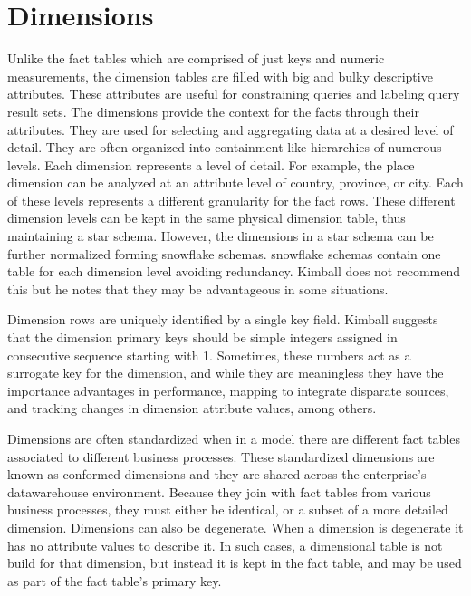 \documentclass[]{article}
\begin{document}

\section{Dimensions} %
\label{sec:dimensions}

Unlike the fact tables which are comprised of just keys and numeric measurements, the dimension tables are filled with big and bulky
descriptive attributes. These attributes are useful for constraining queries and labeling query result sets. The dimensions provide the
context for the facts through their attributes. They are used for selecting and aggregating data at a desired level of detail. They are
often organized into containment-like hierarchies of numerous levels. Each dimension represents a level of detail. For example, the
place dimension can be analyzed at an attribute level of country, province, or city. Each of these levels represents a different
granularity for the fact rows. These different dimension levels can be kept in the same physical dimension table, thus maintaining a
star schema. However, the dimensions in a star schema can be further normalized forming snowflake schemas. snowflake schemas contain one
table for each dimension level avoiding redundancy. Kimball does not recommend this but he notes that they may be advantageous in some
situations.

Dimension rows are uniquely identified by a single key field. Kimball suggests that the dimension primary keys should be simple integers
assigned in consecutive sequence starting with 1. Sometimes, these numbers act as a surrogate key for the dimension, and while they are
meaningless they have the importance advantages in performance, mapping to integrate disparate sources, and tracking changes in
dimension attribute values, among others.

Dimensions are often standardized when in a model there are different fact tables associated to different business processes. These
standardized dimensions are known as conformed dimensions and they are shared across the enterprise's datawarehouse environment. Because
they join with fact tables from various business processes, they must either be identical, or a subset of a more detailed dimension.
Dimensions can also be degenerate. When a dimension is degenerate it has no attribute values to describe it. In such cases, a
dimensional table is not build for that dimension, but instead it is kept in the fact table, and may be used as part of the fact table's
primary key.
\end{document}
